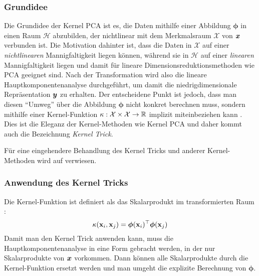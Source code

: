 \subsubsection{Grundidee}
\label{ch:MethodenDerDimRed:traditionell:kPCA:Grundidee}

Die Grundidee der Kernel PCA ist es, die Daten mithilfe einer Abbildung $\bm{\phi}$ in einen Raum
$\mathcal{H}$ abzubilden, der nichtlinear mit dem Merkmalsraum $\mathcal{X}$ von $\bm{x}$
verbunden ist. Die Motivation dahinter ist, dass die Daten in $\mathcal{X}$ auf einer
\textit{nichtlinearen} Mannigfaltigkeit liegen können, während sie in $\mathcal{H}$ auf einer
\textit{linearen} Mannigfaltigkeit liegen und damit für lineare Dimensionsreduktionsmethoden wie
PCA geeignet sind. Nach der Transformation wird also die lineare Hauptkomponentenanalyse
durchgeführt, um damit die niedrigdimensionale Repräsentation $\bm{y}$ zu erhalten. Der
entscheidene Punkt ist jedoch, dass man diesen \enquote{Umweg} über die Abbildung $\bm{\phi}$ nicht
konkret berechnen muss, sondern mithilfe einer Kernel-Funktion $\kappa: \mathcal{X} \times
	\mathcal{X} \rightarrow \mathbb{R}$ implizit miteinbeziehen kann \parencites[586 -- 588]{Bishop.2006}[583]{Scholkopf.1997}. Dies ist die Eleganz der Kernel-Methoden wie
Kernel PCA und daher kommt auch die Bezeichnung \textit{Kernel Trick}.

Für eine eingehendere Behandlung des Kernel Tricks und anderer Kernel-Methoden wird auf
\textcite{ShaweTaylor.2011} verwiesen.

\subsubsection{Anwendung des Kernel Tricks}
\label{ch:MethodenDerDimRed:traditionell:kPCA:AnwendungKernelTrick}

Die Kernel-Funktion ist definiert als das Skalarprodukt im transformierten Raum \parencite[60]{ShaweTaylor.2011}:
\begin{equation}
	\kappa(\mathbf{x}_i, \mathbf{x}_j) = \bm{\phi}(\mathbf{x}_i)^\top \bm{\phi}(\mathbf{x}_j)
\end{equation}
Damit man den Kernel Trick anwenden kann, muss die Hauptkomponentenanalyse in eine Form gebracht werden, in der nur Skalarprodukte von $\bm{x}$ vorkommen. Dann können alle Skalarprodukte durch die Kernel-Funktion ersetzt werden \parencite[586]{Bishop.2006} und man umgeht die explizite Berechnung von $\bm{\phi}$.

